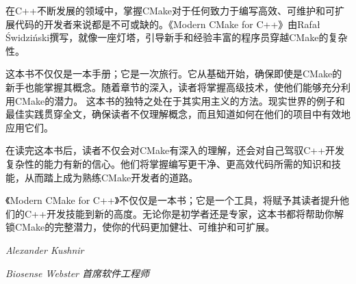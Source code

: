 
在C++不断发展的领域中，掌握CMake对于任何致力于编写高效、可维护和可扩展代码的开发者来说都是不可或缺的。《Modern CMake for C++》由Rafał Świdziński撰写，就像一座灯塔，引导新手和经验丰富的程序员穿越CMake的复杂性。

这本书不仅仅是一本手册；它是一次旅行。它从基础开始，确保即使是CMake的新手也能掌握其概念。随着章节的深入，读者将掌握高级技术，使他们能够充分利用CMake的潜力。 这本书的独特之处在于其实用主义的方法。现实世界的例子和最佳实践贯穿全文，确保读者不仅理解概念，而且知道如何在他们的项目中有效地应用它们。

在读完这本书后，读者不仅会对CMake有深入的理解，还会对自己驾驭C++开发复杂性的能力有新的信心。他们将掌握编写更干净、更高效代码所需的知识和技能，从而踏上成为熟练CMake开发者的道路。

《Modern CMake for C++》不仅仅是一本书；它是一个工具，将赋予其读者提升他们的C++开发技能到新的高度。无论你是初学者还是专家，这本书都将帮助你解锁CMake的完整潜力，使你的代码更加健壮、可维护和可扩展。

\begin{center}
\textit{Alexander Kushnir}

\textit{Biosense Webster 首席软件工程师}
\end{center}

